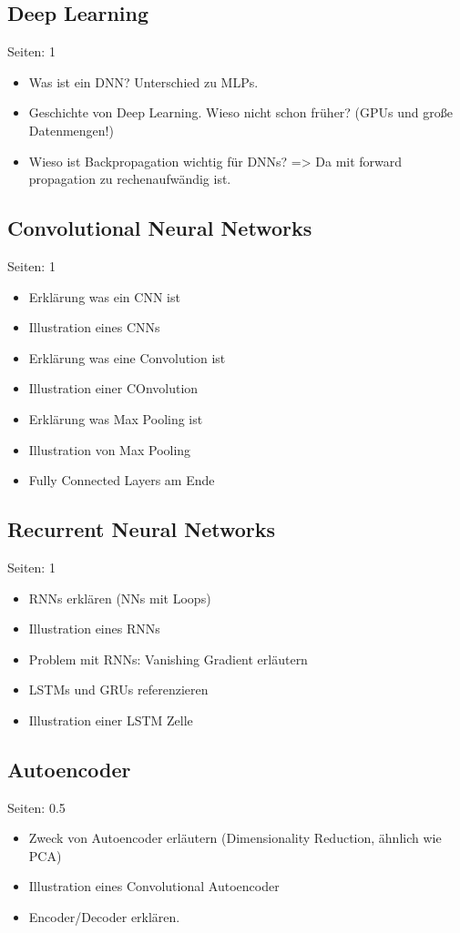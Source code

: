\documentclass[draft,final,oneside]{vutinfth} %
\begin{document}
\subsection{Deep Learning}
Seiten: 1
\begin{itemize}
\item Was ist ein DNN? Unterschied zu MLPs.
\item Geschichte von Deep Learning. Wieso nicht schon früher? (GPUs und große Datenmengen!)
\item Wieso ist Backpropagation wichtig für DNNs? => Da mit forward propagation zu rechenaufwändig ist.
\end{itemize}


\subsection{Convolutional Neural Networks}
Seiten: 1
\begin{itemize}

\item Erklärung was ein CNN ist
\item Illustration eines CNNs
\item Erklärung was eine Convolution ist
\item Illustration einer COnvolution
\item Erklärung was Max Pooling ist
\item Illustration von Max Pooling
\item Fully Connected Layers am Ende

\end{itemize}

\subsection{Recurrent Neural Networks}
Seiten: 1
\begin{itemize}

\item RNNs erklären (NNs mit Loops)
\item Illustration eines RNNs
\item Problem mit RNNs: Vanishing Gradient erläutern
\item LSTMs und GRUs referenzieren
\item Illustration einer LSTM Zelle

\end{itemize}


\subsection{Autoencoder}
Seiten: 0.5
\begin{itemize}
\item Zweck von Autoencoder erläutern (Dimensionality Reduction, ähnlich wie PCA)
\item Illustration eines Convolutional Autoencoder
\item Encoder/Decoder erklären.
\end{itemize}
\end{document}
